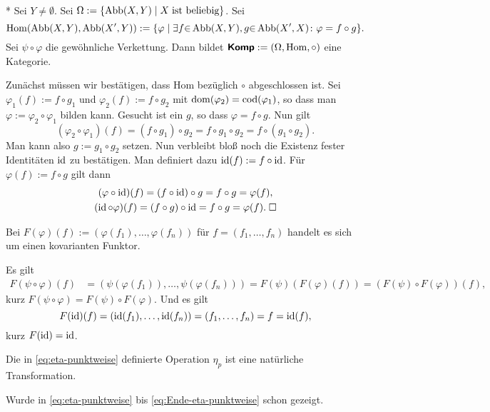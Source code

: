\begin{Satz}\mbox{}\\*
Sei $Y\ne\emptyset$. Sei $\Omega:=\{\operatorname{Abb}(X,Y)\mid X\;\text{ist beliebig}\}$.
Sei%
\[\mathrm{Hom}(\operatorname{Abb}(X,Y),\operatorname{Abb}(X',Y))
:= \{\varphi\mid\exists f{\in}\operatorname{Abb}(X,Y), g{\in}\operatorname{Abb}(X',X)\colon
\varphi = f\circ g\}.\]
Sei $\psi\circ \varphi$ die gewöhnliche Verkettung. Dann bildet
$\textsf{\textbf{Komp}}:=(\Omega,\mathrm{Hom},\circ)$ eine Kategorie.
\end{Satz}
Zunächst müssen wir bestätigen, dass $\mathrm{Hom}$ bezüglich
$\circ$ abgeschlossen ist. Sei $\varphi_1(f):=f\circ g_1$ und
$\varphi_2(f):=f\circ g_2$ mit $\operatorname{dom}(\varphi_2)=\operatorname{cod}(\varphi_1)$, so
dass man $\varphi:=\varphi_2\circ\varphi_1$ bilden kann.
Gesucht ist ein $g$, so dass $\varphi = f\circ g$. Nun gilt%
\begin{equation}
(\varphi_2\circ\varphi_1)(f) = (f\circ g_1)\circ g_2
= f\circ g_1\circ g_2 = f\circ (g_1\circ g_2).
\end{equation}
Man kann also $g:=g_1\circ g_2$ setzen. Nun verbleibt bloß noch die
Existenz fester Identitäten $\operatorname{id}$ zu bestätigen. Man definiert dazu
$\operatorname{id}(f):=f\circ\operatorname{id}$. Für $\varphi(f):=f\circ g$ gilt dann%
\begin{gather}
(\varphi\circ\operatorname{id})(f) = (f\circ \operatorname{id})\circ g = f\circ g = \varphi(f),\\
(\operatorname{id}\circ\varphi)(f) = (f\circ g)\circ\operatorname{id} = f\circ g = \varphi(f).\;\Box
\end{gather}
\begin{Satz}
Bei $F(\varphi)(f):=(\varphi(f_1),\ldots,\varphi(f_n))$ für
$f=(f_1,\ldots,f_n)$ handelt es sich um einen kovarianten Funktor.
\end{Satz}
 Es gilt
\begin{align}
F(\psi\circ\varphi)(f) &= (\psi(\varphi(f_1)),\ldots,\psi(\varphi(f_n)))
= F(\psi)(F(\varphi)(f))
= (F(\psi)\circ F(\varphi))(f),
\end{align}
kurz $F(\psi\circ\varphi) = F(\psi)\circ F(\varphi)$. Und es gilt
\begin{equation}
F(\operatorname{id})(f) = (\operatorname{id}(f_1),\ldots,\operatorname{id}(f_n)) = (f_1,\ldots,f_n) = f = \operatorname{id}(f),
\end{equation}
kurz $F(\operatorname{id}) = \operatorname{id}$.\;\qedsymbol
\begin{Satz}
Die in \eqref{eq:eta-punktweise} definierte Operation $\eta_p$ ist
eine natürliche Transformation.
\end{Satz}
 Wurde in \eqref{eq:eta-punktweise} bis
\eqref{eq:Ende-eta-punktweise} schon gezeigt.\;\qedsymbol

